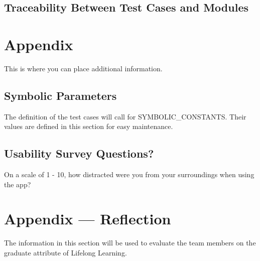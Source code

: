 \documentclass[12pt, titlepage]{article}
\begin{document}
\subsection{Traceability Between Test Cases and Modules}

				




\newpage

\section{Appendix}

This is where you can place additional information.

\subsection{Symbolic Parameters}

The definition of the test cases will call for SYMBOLIC\_CONSTANTS.
Their values are defined in this section for easy maintenance.

\subsection{Usability Survey Questions?}

On a scale of 1 - 10, how distracted were you from your surroundings when using the app?

\newpage{}
\section*{Appendix --- Reflection}


The information in this section will be used to evaluate the team members on the
graduate attribute of Lifelong Learning.


\end{document}
